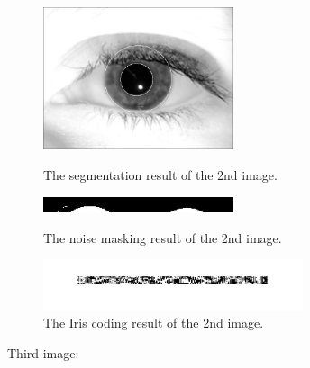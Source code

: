 \documentclass[a4paper]{article}
\begin{document}
\begin{spacing}{2.0}
\begin{enumerate}
	\begin{figure}[H]
	\begin{minipage}[t]{0.3\linewidth}
	\centering
	\includegraphics[width = 2.2in]{fprobe2segmented.jpg}
	\caption{The segmentation result of the 2nd image.}
	\label{seg}
	\end{minipage}
	\begin{minipage}[t]{0.3\linewidth}
	\centering
	\includegraphics[width = 2.2in]{fprobe2polarnoise.jpg}
	\caption{The noise masking result of the 2nd image.}
	\label{noiseM}
	\end{minipage}
	\begin{minipage}[t]{0.3\linewidth}
	\centering
	\includegraphics[width = 3in]{firiscoding2.jpg}
	\caption{The Iris coding result of the 2nd image.}
	\label{IC}
	\end{minipage}
	\end{figure}
	
		Third image:\\
	

\end{enumerate}
\end{spacing}
\end{document}
